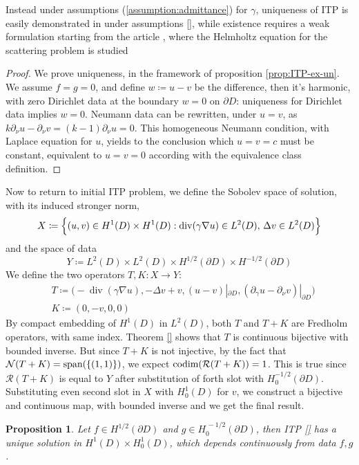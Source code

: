 \documentclass[10pt, a4paper, twoside, openright]{book}
\theoremstyle{definition}
\theoremstyle{plain}
\theoremstyle{plain}
\theoremstyle{plain}
\newtheorem{proposition}[subsection]{Proposition}
\theoremstyle{plain}
\theoremstyle{plain}
\theoremstyle{plain}
\theoremstyle{plain}
\theoremstyle{plain}
\DeclareMathOperator{\divergence}{div}
\begin{document}
Instead under assumptions (\ref{assumption:admittance}) for $\gamma$, uniqueness  of ITP is easily demonstrated in \cite{somersalo:preprint} under assumptions \ref{}, while existence requires a weak formulation starting from the article \cite{cakoni-colton-haddar:lsm}, where the Helmholtz equation for the scattering problem is studied
\begin{proof}
 We prove uniqueness, in the framework of proposition \ref{prop:ITP-ex-un}. We assume $f=g=0$, and define $w\coloneqq u-v$ be the difference, then it's harmonic, with zero Dirichlet data at the boundary $w=0$ on $\partial D$: uniqueness for Dirichlet data implies $w=0$. Neumann data can be rewritten, under $u=v$, as $k\partial_\nu u - \partial_\nu v = (k-1)\partial_\nu u = 0$.
 This homogeneous Neumann condition, with Laplace equation for $u$, yields to the conclusion which $u=v=c$ must be constant, equivalent to $u=v=0$ according with the equivalence class definition.
\end{proof}
Now to return to initial ITP problem, we define the Sobolev space of solution, with its induced stronger norm,
\begin{equation}
 X\coloneqq\Bigl\{(u,v)\in H^1(D)\times H^1(D):\divergence(\gamma\nabla u)\in L^2(D),\,\Delta v\in L^2(D) \Bigr\}
\end{equation}
and the space of data
\begin{equation}
 Y\coloneqq L^2(D) \times L^2(D) \times H^{1/2}(\partial D) \times H^{-1/2}(\partial D)
\end{equation}
We define the two operators $T,K:X\to Y$:
\begin{align}
& T \coloneqq \bigl(-\divergence(\gamma\nabla u), -\Delta v + v, (u - v)|_{\partial D}, (\partial_\gamma u -\partial_\nu v)|_{\partial D}\bigr)\\
& K \coloneqq (0, -v, 0 , 0)
\end{align}
By compact embedding of $H^1(D)$ in $L^2(D)$, both $T$ and $T+K$ are Fredholm operators, with same index. Theorem \ref{} shows that $T$ is continuous bijective with bounded inverse. But since $T+K$ is not injective, by the fact that $\mathcal{N}(T+K)=\textup{span}(\{(1,1)\})$, we expect $\textup{codim}(\mathcal{R}(T+K))=1$. This is true since $\mathcal{R}(T+K)$ is equal to $Y$ after substitution of forth slot with $H^{-1/2}_0(\partial D)$. Substituting even second slot in $X$ with $H^1_0(D)$ for $v$, we construct a bijective and continuous map, with bounded inverse and we get the final result.
\begin{proposition}
 Let $f\in H^{1/2}(\partial D)$ and $g\in H^{\,-1/2}_0(\partial D)$, then ITP \ref{} has a unique solution in $H^1(D)\times H^1_0(D)$, which depends continuously from data $f,g$.
\end{proposition}
\end{document}
